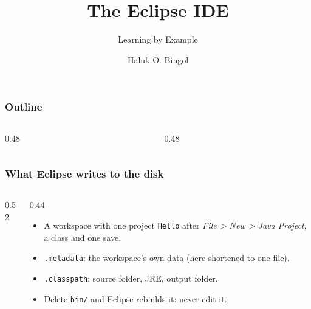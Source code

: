 \documentclass[aspectratio=169,10pt,compress]{beamer}
\title{The Eclipse IDE}
\subtitle{Learning by Example}
\author[Bingol]{Haluk O. Bingol}
\institute[FCIS]{
    Faculty of Computer and Information Sciences\\
    Yeditepe University
}
\date{
	{\tiny \hbTimeStamp}
}
\begin{document}
\begin{frame}[t,fragile]
  \titlepage
\end{frame}




\begin{frame}[t,fragile] \frametitle{Outline}
  \begin{columns}[T]
    \begin{column}{0.48\textwidth}
      \tableofcontents[sections={1-4}, hideallsubsections]
    \end{column}
    \begin{column}{0.48\textwidth}
      \tableofcontents[sections={5-8}, hideallsubsections]
    \end{column}
  \end{columns}
\end{frame}





\begin{frame}[t,fragile] \frametitle{What Eclipse writes to the disk}
  \begin{columns}[T]
    \begin{column}{0.52\textwidth}
    \end{column}
    \begin{column}{0.44\textwidth}
      \begin{itemize}\small
        \item A workspace with one project \texttt{Hello} after \emph{File > New > Java Project}, a class and one save.
        \item \texttt{.metadata}: the workspace's own data (here shortened to one file).
        \item \texttt{.classpath}: source folder, JRE, output folder.
        \item Delete \texttt{bin/} and Eclipse rebuilds it: never edit it.
      \end{itemize}
    \end{column}
  \end{columns}
\end{frame}
\end{document}
